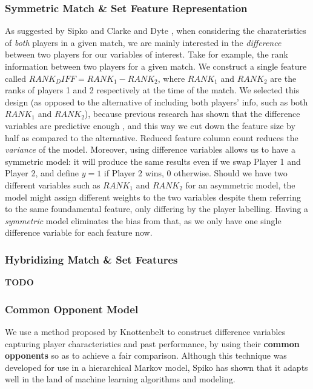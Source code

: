 \documentclass[paper=a4, fontsize=11pt]{scrartcl} %
\numberwithin{equation}{section} %
\numberwithin{figure}{section} %
\numberwithin{table}{section} %
\begin{document}
\subsubsection{Symmetric Match \& Set Feature Representation}
As suggested by Sipko \cite{tennis1} and Clarke and Dyte \cite{Clarke2010}, when considering the charateristics of \textit{both} players in a given match, we are mainly interested in the \textit{difference} between two players for our variables of interest. Take for example, the rank information between two players for a given match. We construct a single feature called $RANK_DIFF = RANK_1 - RANK_2$, where $RANK_1$ and $RANK_2$ are the ranks of players 1 and 2 respectively at the time of the match. We selected this design (as opposed to the alternative of including both players' info, such as both $RANK_1$ and $RANK_2$), because previous research has shown that the difference variables are predictive enough \cite{tennis1} \cite{omalley}, and this way we cut down the feature size by half as compared to the alternative. Reduced feature column count reduces the \textit{variance} of the model. Moreover, using difference variables allows us to have a symmetric model: it will produce the same results even if we swap Player 1 and Player 2, and define $y = 1$ if Player 2 wins, 0 otherwise. Should we have two different variables such as $RANK_1$ and $RANK_2$ for an asymmetric model, the model might assign different weights to the two variables despite them referring to the same foundamental feature, only differing by the player labelling. Having a \textit{symmetric} model eliminates the bias from that, as we only have one single difference variable for each feature now. 
\subsubsection{Hybridizing Match \& Set Features}
\textbf{TODO}
\subsubsection{Common Opponent Model}
We use a method proposed by Knottenbelt \cite{KNOTTENBELT20123820} to construct difference variables capturing player characteristics and past performance, by using their \textbf{common opponents} so as to achieve a fair comparison. Although this technique was developed for use in a hierarchical Markov model, Spiko \cite{tennis1} has shown that it adapts well in the land of machine learning algorithms and modeling. 
\end{document}
